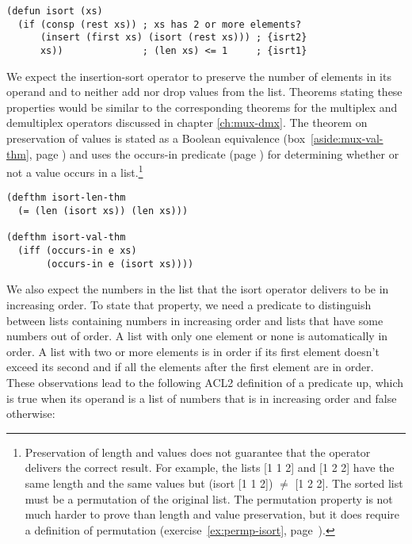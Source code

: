 \label{defun:isort}
\begin{code}
\begin{verbatim}
(defun isort (xs)
  (if (consp (rest xs)) ; xs has 2 or more elements?
      (insert (first xs) (isort (rest xs))) ; {isrt2}
      xs))              ; (len xs) <= 1     ; {isrt1}
\end{verbatim}
\end{code}

We expect the insertion-sort operator to preserve
the number of elements in its operand and to
neither add nor drop values from the list.
Theorems stating these properties would be
similar to the corresponding theorems for
the multiplex and demultiplex operators discussed
in chapter \ref{ch:mux-dmx}.
The theorem on preservation of values is
stated as a
Boolean
equivalence
(box~\ref{aside:mux-val-thm}, page \pageref{aside:mux-val-thm})
and uses the \textsf{occurs-in }predicate
(page \pageref{def:occurs-in}) for determining
whether or not a value occurs in a list.\footnote{Preservation
of length and values does not guarantee
that the operator delivers the correct result.
For example, the lists \textsf{[1 1 2]} and \textsf{[1 2 2]} have the
same length and the same values
but \textsf{(isort [1 1 2]) $\neq$ [1 2 2]}.
The sorted list must be a permutation of the original list.
The permutation property is not much harder
to prove than length and value preservation,
but it does require a definition of permutation
(exercise~\ref{ex:permp-isort}, page~\pageref{ex:permp-isort}).}

\label{defthm:isort-len}
\label{defthm:isort-val}
\begin{code}
\begin{verbatim}
(defthm isort-len-thm
  (= (len (isort xs)) (len xs)))

(defthm isort-val-thm
  (iff (occurs-in e xs)
       (occurs-in e (isort xs))))
\end{verbatim}
\end{code}

We also expect the numbers in the list
that the \textsf{isort} operator
delivers to be in increasing order.
To state that property, we need a predicate
to distinguish between lists containing numbers in increasing order
and lists that have some numbers out of order.
A list with only one element or none is automatically in order.
A list with two or more elements is in order
if its first element doesn't exceed its second and if
all the elements after the first element are in order.
These observations lead to the following
ACL2 definition of a predicate \textsf{up},
which is true when its operand is a list
of numbers that is in increasing order and false otherwise:


